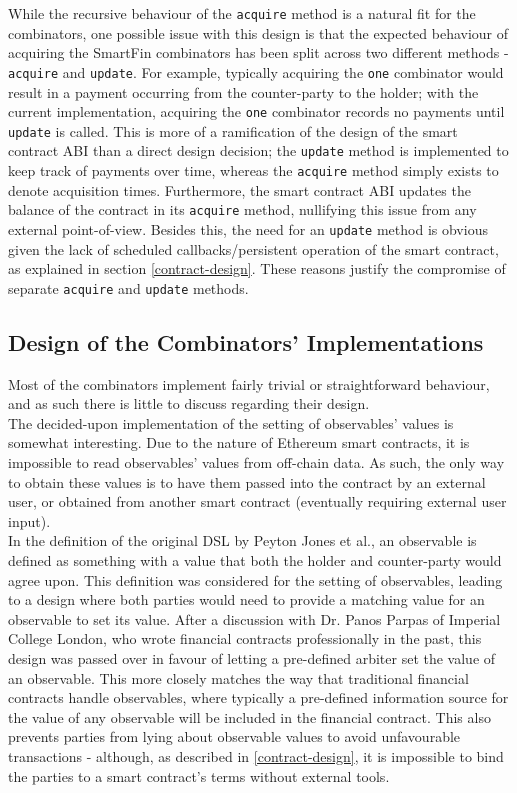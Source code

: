 While the recursive behaviour of the \texttt{acquire} method is a natural fit for the combinators, one possible issue with this design is that the expected behaviour of acquiring the SmartFin combinators has been split across two different methods - \texttt{acquire} and \texttt{update}. For example, typically acquiring the \texttt{one} combinator would result in a payment occurring from the counter-party to the holder; with the current implementation, acquiring the \texttt{one} combinator records no payments until \texttt{update} is called. This is more of a ramification of the design of the smart contract ABI than a direct design decision; the \texttt{update} method is implemented to keep track of payments over time, whereas the \texttt{acquire} method simply exists to denote acquisition times. Furthermore, the smart contract ABI updates the balance of the contract in its \texttt{acquire} method, nullifying this issue from any external point-of-view. Besides this, the need for an \texttt{update} method is obvious given the lack of scheduled callbacks/persistent operation of the smart contract, as explained in section \ref{contract-design}. These reasons justify the compromise of separate \texttt{acquire} and \texttt{update} methods.


\subsection{Design of the Combinators' Implementations}

Most of the combinators implement fairly trivial or straightforward behaviour, and as such there is little to discuss regarding their design. \\

The decided-upon implementation of the setting of observables' values is somewhat interesting. Due to the nature of Ethereum smart contracts, it is impossible to read observables' values from off-chain data. As such, the only way to obtain these values is to have them passed into the contract by an external user, or obtained from another smart contract (eventually requiring external user input). \\

In the definition of the original DSL by Peyton Jones et al.\cite{SPJ}, an observable is defined as something with a value that both the holder and counter-party would agree upon. This definition was considered for the setting of observables, leading to a design where both parties would need to provide a matching value for an observable to set its value. After a discussion with Dr. Panos Parpas of Imperial College London, who wrote financial contracts professionally in the past, this design was passed over in favour of letting a pre-defined arbiter set the value of an observable. This more closely matches the way that traditional financial contracts handle observables, where typically a pre-defined information source for the value of any observable will be included in the financial contract. This also prevents parties from lying about observable values to avoid unfavourable transactions - although, as described in \ref{contract-design}, it is impossible to bind the parties to a smart contract's terms without external tools.


